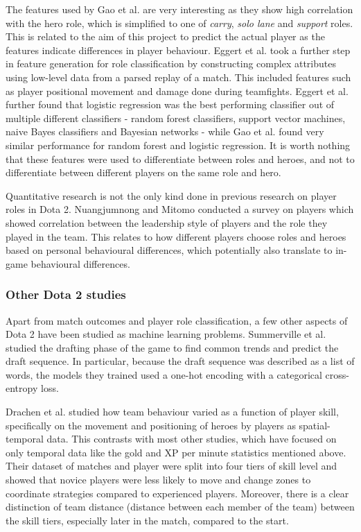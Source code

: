 \documentclass[Report.tex]{subfiles}
\begin{document}
The features used by Gao et al. are very interesting as they show high correlation with the hero role, which is simplified to one of \textit{carry}, \textit{solo lane} and \textit{support} roles. This is related to the aim of this project to predict the actual player as the features indicate differences in player behaviour. Eggert et al. \cite{dota-eggert} took a further step in feature generation for role classification by constructing complex attributes using low-level data from a parsed replay of a match. This included features such as player positional movement and damage done during teamfights. Eggert et al. \cite{dota-eggert} further found that logistic regression was the best performing classifier out of multiple different classifiers - random forest classifiers, support vector machines, naive Bayes classifiers and Bayesian networks - while Gao et al. \cite{dota-gao} found very similar performance for random forest and logistic regression. It is worth nothing that these features were used to differentiate between roles and heroes, and not to differentiate between different players on the same role and hero.

Quantitative research is not the only kind done in previous research on player roles in Dota 2. Nuangjumnong and Mitomo \cite{dota-leadership} conducted a survey on players which showed correlation between the leadership style of players and the role they played in the team. This relates to how different players choose roles and heroes based on personal behavioural differences, which potentially also translate to in-game behavioural differences.  

\subsubsection{Other Dota 2 studies}
Apart from match outcomes and player role classification, a few other aspects of Dota 2 have been studied as machine learning problems. Summerville et al. \cite{dota-draft} studied the drafting phase of the game to find common trends and predict the draft sequence. In particular, because the draft sequence was described as a list of words, the models they trained used a one-hot encoding with a categorical cross-entropy loss.

Drachen et al. \cite{dota-skill} studied how team behaviour varied as a function of player skill, specifically on the movement and positioning of heroes by players as spatial-temporal data. This contrasts with most other studies, which have focused on only temporal data like the gold and XP per minute statistics mentioned above. Their dataset of matches and player were split into four tiers of skill level and showed that novice players were less likely to move and change zones to coordinate strategies compared to experienced players. Moreover, there is a clear distinction of team distance (distance between each member of the team) between the skill tiers, especially later in the match, compared to the start.
\end{document}
